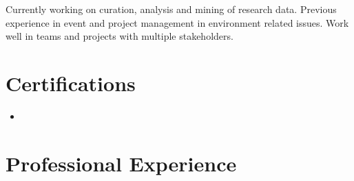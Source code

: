 \documentclass[11pt,a4paper,sans]{moderncv}        %
\begin{document}
\makecvtitle

\small{Currently working on curation, analysis and mining of research data. Previous experience in event and project management in environment related issues. Work well in teams and projects with multiple stakeholders.}

\section{Certifications}

    \vspace{5pt}
\begin{itemize}
    \item{}
\end{itemize}
\section{Professional Experience}
    \vspace{5pt}
\end{document}
